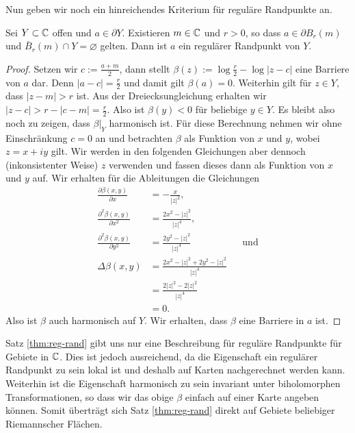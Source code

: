 Nun geben wir noch ein hinreichendes Kriterium für reguläre Randpunkte an.

\begin{thm}
  \label{thm:reg-rand}
  Sei $Y \subset \mathbb{C}$ offen und $a \in \partial Y$. Existieren $m \in \mathbb{C}$
  und $r > 0$, so dass $a \in \partial B_r(m)$ und $\bar
  B_r(m) \cap Y = \varnothing$ gelten. Dann ist $a$ ein regulärer Randpunkt von $Y$.
\end{thm}

\begin{proof}
  Setzen wir $c := \frac{a+m}{2}$, dann stellt $\beta(z) := \log
  \frac{r}{2} - \log|z-c|$ eine Barriere von $a$ dar. Denn $|a - c| =
  \frac{r}{2}$ und damit gilt $\beta(a) = 0$. Weiterhin gilt für $z
  \in Y$, dass $|z-m| > r$ ist. Aus der Dreiecksungleichung erhalten
  wir $|z-c| > r - |c-m| = \frac{r}{2}$. Also ist $\beta(y) < 0$ für
  beliebige $y \in Y$. Es bleibt also noch zu zeigen, dass $\beta|_Y$
  harmonisch ist. Für diese Berechnung nehmen wir ohne Einschränkung
  $c = 0$ an und betrachten $\beta$ als Funktion von $x$ und $y$,
  wobei $z = x + iy$ gilt. Wir werden in den folgenden Gleichungen
  aber dennoch (inkonsistenter Weise) $z$ verwenden und fassen dieses
  dann als Funktion von $x$ und $y$ auf. Wir erhalten für die
  Ableitungen die Gleichungen 
  \begin{align*}
    \frac{\partial \beta(x,y)}{\partial x} & = - \frac{x}{|z|^2}, \\
    \frac{\partial^2 \beta(x,y)}{\partial x^2} & = \frac{2x^2 -
      |z|^2}{|z|^4}, \\
    \frac{\partial^2 \beta(x,y)}{\partial y^2} & = \frac{2y^2 -
      |z|^2}{|z|^4} && \text{und} \\
    \Delta \beta(x,y) & = \frac{2 x^2 - |z|^2 + 2y^2 -|z|^2}{|z|^4} \\
    & = \frac{2 |z|^2 - 2|z|^2}{|z|^4} \\
    & = 0.
  \end{align*}
  Also ist $\beta$ auch harmonisch auf $Y$. Wir erhalten, dass $\beta$
  eine Barriere in $a$ ist.
\end{proof}

\begin{rem}
  \label{rem:reg-rand}
  Satz \ref{thm:reg-rand} gibt uns nur eine Beschreibung für reguläre
  Randpunkte für Gebiete in $\mathbb{C}$. Dies ist jedoch ausreichend, da die
  Eigenschaft ein regulärer Randpunkt zu sein lokal ist und deshalb
  auf Karten nachgerechnet werden kann. Weiterhin ist die Eigenschaft
  harmonisch zu sein invariant unter biholomorphen Transformationen,
  so dass wir das obige $\beta$ einfach auf einer Karte angeben
  können. Somit überträgt sich Satz \ref{thm:reg-rand} direkt auf
  Gebiete beliebiger Riemannscher Flächen.
\end{rem}


